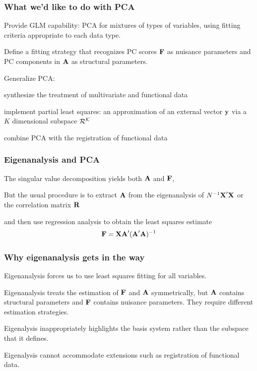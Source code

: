 \documentclass[11pt]{beamer}
\begin{document}

\begin{frame}

\frametitle{What we'd like to do with PCA}

\bi
  \item Provide GLM capability: PCA for mixtures of types of variables, using fitting criteria
  appropriate to each data type.
  \item Define a fitting strategy that recognizes PC scores $\mbox{\bf F}$ as nuisance parameters
  and PC components in $\mbox{\bf A}$ as structural parameters.
  \item Generalize PCA:
    \bi
      \item synthesize the treatment of multivariate and functional data
      \item implement partial least squares: an approximation of an external vector $\mbox{\bf y}$ via a $K$ dimensional subspace $\cal{R}^K$
      \item combine PCA with the registration of functional data
    \ei
\ei

\end{frame}


\begin{frame}

\frametitle{Eigenanalysis and PCA}

\bi
  \item The singular value decomposition yields both $\mbox{\bf A}$ and $\mbox{\bf F}$,
  \item But the usual procedure is to extract $\mbox{\bf A}$ from the eigenanalysis of $N^{-1} \mbox{\bf X}' \mbox{\bf X}$
  or the correlation matrix $\mbox{\bf R}$
  \item and then use regression analysis to obtain the least squares estimate
  \[
    \mbox{\bf F} = \mbox{\bf X} \mbox{\bf A}' (\mbox{\bf A}' \mbox{\bf A})^{-1}
  \]
\ei

\end{frame}


\begin{frame}

\frametitle{Why eigenanalysis gets in the way}

\bi
  \item Eigenanalysis forces us to use least squares fitting for all variables.
  \item Eigenanalysis treats the estimation of $\mbox{\bf F}$ and $\mbox{\bf A}$ symmetrically, but $\mbox{\bf A}$ contains structural parameters and $\mbox{\bf F}$ contains nuisance parameters.  They require different estimation strategies.
  \item Eigenalysis inappropriately highlights the basis system rather than the subspace that it defines.
  \item Eigenalysis cannot accommodate extensions such as registration of functional data.
\ei

\end{frame}
\end{document}
